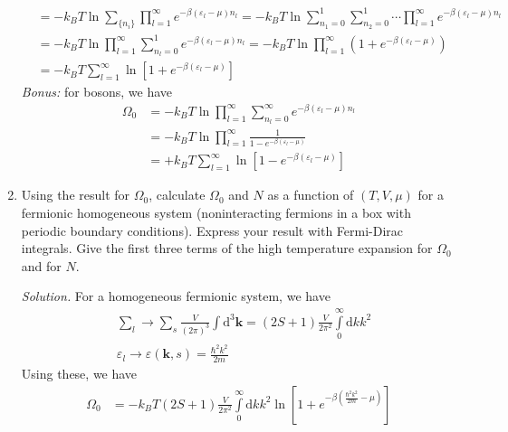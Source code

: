 \documentclass[11pt, a4paper]{article}
\newcommand{\dd}{\mathrm{d}}
\begin{document}
\begin{enumerate}
\begin{align*}
        &= -k_BT \ln \sum\limits_{\{n_i\}}\prod\limits_{l=1}^{\infty}e^{-\beta(\varepsilon_l-\mu) n_l}
        = -k_BT \ln \sum\limits_{n_1=0}^1\sum\limits_{n_2=0}^1\cdots \prod\limits_{l=1}^{\infty}e^{-\beta(\varepsilon_l-\mu) n_l}\\
        &= -k_BT \ln \prod\limits_{l=1}^{\infty}\sum\limits_{n_l=0}^1 e^{-\beta(\varepsilon_l-\mu) n_l}
        = -k_BT \ln \prod\limits_{l=1}^{\infty}\left(1+e^{-\beta(\varepsilon_l-\mu)}\right)\\
        &= -k_BT \sum\limits_{l=1}^{\infty}\ln\left[1+e^{-\beta(\varepsilon_l-\mu)}\right]
    \end{align*}
    \textit{Bonus:} for bosons, we have
    \begin{align*}
        \Omega_0 &= -k_BT \ln \prod\limits_{l=1}^{\infty}\sum\limits_{n_l=0}^{\infty} e^{-\beta(\varepsilon_l-\mu) n_l}\\
        &= -k_BT \ln \prod\limits_{l=1}^{\infty} \frac{1}{1-e^{-\beta(\varepsilon_l-\mu)}}\\
        &= +k_BT \sum \limits_{l=1}^{\infty} \ln \left[1-e^{-\beta(\varepsilon_l-\mu)}\right]
    \end{align*}
    \item Using the result for $\Omega_0$, calculate $\Omega_0$ and $N$ as a function of $(T,V,\mu)$
    for a fermionic homogeneous system (noninteracting fermions in a box with periodic boundary
    conditions). Express your result with Fermi-Dirac integrals. Give the first three terms of the
    high temperature expansion for $\Omega_0$ and for $N$.
    \par\textit{Solution.}
    For a homogeneous fermionic system, we have
    \begin{align*}
        &\sum\limits_l \longrightarrow \sum\limits_s\frac{V}{(2\pi)^3}\int \dd^3\mathbf{k}
        = (2S+1)\frac{V}{2\pi^2}\int\limits_{0}^{\infty} \dd k k^2 \\
        &\varepsilon_l \longrightarrow \varepsilon(\mathbf{k},s) = \frac{\hbar^2k^2}{2m}
    \end{align*}
    Using these, we have
    \begin{align*}
        \Omega_0 &= -k_BT (2S+1)\frac{V}{2\pi^2}\int\limits_{0}^{\infty} \dd k k^2 \ln\left[1+e^{-\beta\left(\frac{\hbar^2k^2}{2m} - \mu\right)}\right]

\end{align*}
\end{enumerate}
\end{document}
